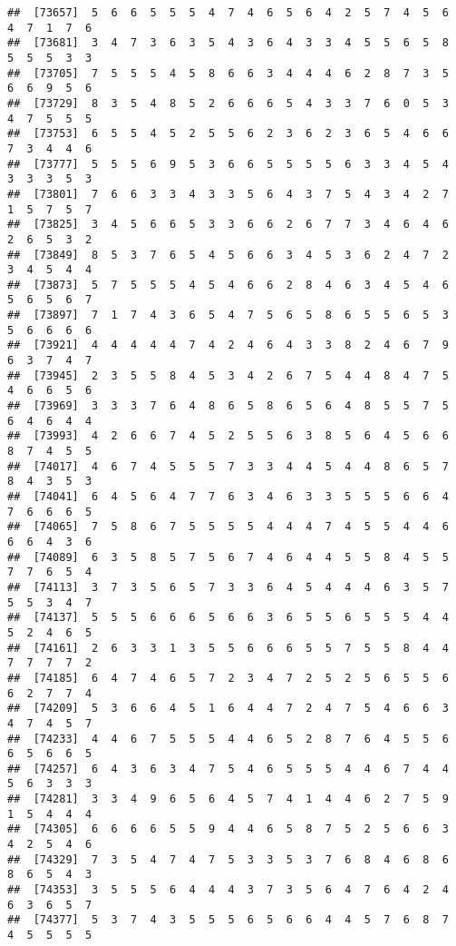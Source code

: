 \documentclass[
]{book}
\begin{document}
\begin{verbatim}
##  [73657]  5  6  6  5  5  5  4  7  4  6  5  6  4  2  5  7  4  5  6  4  7  1  7  6
##  [73681]  3  4  7  3  6  3  5  4  3  6  4  3  3  4  5  5  6  5  8  5  5  5  3  3
##  [73705]  7  5  5  5  4  5  8  6  6  3  4  4  4  6  2  8  7  3  5  6  6  9  5  6
##  [73729]  8  3  5  4  8  5  2  6  6  6  5  4  3  3  7  6  0  5  3  4  7  5  5  5
##  [73753]  6  5  5  4  5  2  5  5  6  2  3  6  2  3  6  5  4  6  6  7  3  4  4  6
##  [73777]  5  5  5  6  9  5  3  6  6  5  5  5  5  6  3  3  4  5  4  3  3  3  5  3
##  [73801]  7  6  6  3  3  4  3  3  5  6  4  3  7  5  4  3  4  2  7  1  5  7  5  7
##  [73825]  3  4  5  6  6  5  3  3  6  6  2  6  7  7  3  4  6  4  6  2  6  5  3  2
##  [73849]  8  5  3  7  6  5  4  5  6  6  3  4  5  3  6  2  4  7  2  3  4  5  4  4
##  [73873]  5  7  5  5  5  4  5  4  6  6  2  8  4  6  3  4  5  4  6  5  6  5  6  7
##  [73897]  7  1  7  4  3  6  5  4  7  5  6  5  8  6  5  5  6  5  3  5  6  6  6  6
##  [73921]  4  4  4  4  4  7  4  2  4  6  4  3  3  8  2  4  6  7  9  6  3  7  4  7
##  [73945]  2  3  5  5  8  4  5  3  4  2  6  7  5  4  4  8  4  7  5  4  6  6  5  6
##  [73969]  3  3  3  7  6  4  8  6  5  8  6  5  6  4  8  5  5  7  5  6  4  6  4  4
##  [73993]  4  2  6  6  7  4  5  2  5  5  6  3  8  5  6  4  5  6  6  8  7  4  5  5
##  [74017]  4  6  7  4  5  5  5  7  3  3  4  4  5  4  4  8  6  5  7  8  4  3  5  3
##  [74041]  6  4  5  6  4  7  7  6  3  4  6  3  3  5  5  5  6  6  4  7  6  6  6  5
##  [74065]  7  5  8  6  7  5  5  5  5  4  4  4  7  4  5  5  4  4  6  6  6  4  3  6
##  [74089]  6  3  5  8  5  7  5  6  7  4  6  4  4  5  5  8  4  5  5  7  7  6  5  4
##  [74113]  3  7  3  5  6  5  7  3  3  6  4  5  4  4  4  6  3  5  7  5  5  3  4  7
##  [74137]  5  5  5  6  6  6  5  6  6  3  6  5  5  6  5  5  5  4  4  5  2  4  6  5
##  [74161]  2  6  3  3  1  3  5  5  6  6  6  5  5  7  5  5  8  4  4  7  7  7  7  2
##  [74185]  6  4  7  4  6  5  7  2  3  4  7  2  5  2  5  6  5  5  6  6  2  7  7  4
##  [74209]  5  3  6  6  4  5  1  6  4  4  7  2  4  7  5  4  6  6  3  4  7  4  5  7
##  [74233]  4  4  6  7  5  5  5  4  4  6  5  2  8  7  6  4  5  5  6  6  5  6  6  5
##  [74257]  6  4  3  6  3  4  7  5  4  6  5  5  5  4  4  6  7  4  4  5  6  3  3  3
##  [74281]  3  3  4  9  6  5  6  4  5  7  4  1  4  4  6  2  7  5  9  1  5  4  4  4
##  [74305]  6  6  6  6  5  5  9  4  4  6  5  8  7  5  2  5  6  6  3  4  2  5  4  6
##  [74329]  7  3  5  4  7  4  7  5  3  3  5  3  7  6  8  4  6  8  6  8  6  5  4  3
##  [74353]  3  5  5  5  6  4  4  4  3  7  3  5  6  4  7  6  4  2  4  6  3  6  5  7
##  [74377]  5  3  7  4  3  5  5  5  6  5  6  6  4  4  5  7  6  8  7  4  5  5  5  5

\end{verbatim}
\end{document}
